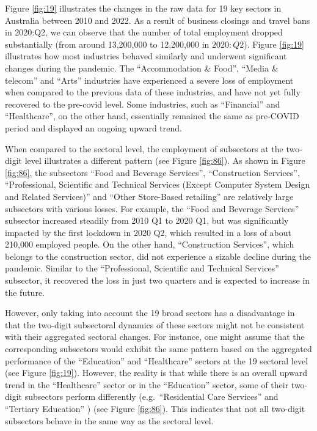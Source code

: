 \documentclass{monashthesis}
\begin{document}
Figure \ref{fig:19} illustrates the changes in the raw data for 19 key sectors in Australia between 2010 and 2022. As a result of business closings and travel bans in 2020:Q2, we can observe that the number of total employment dropped substantially (from around 13,200,000 to 12,200,000 in \(2020:Q2\)). Figure \ref{fig:19} illustrates how most industries behaved similarly and underwent significant changes during the pandemic. The ``Accommodation \& Food'', ``Media \& telecom'' and ``Arts'' industries have experienced a severe loss of employment when compared to the previous data of these industries, and have not yet fully recovered to the pre-covid level. Some industries, such as ``Financial'' and ``Healthcare'', on the other hand, essentially remained the same as pre-COVID period and displayed an ongoing upward trend.

When compared to the sectoral level, the employment of subsectors at the two-digit level illustrates a different pattern (see Figure \ref{fig:86}). As shown in Figure \ref{fig:86}, the subsectors ``Food and Beverage Services'', ``Construction Services'', ``Professional, Scientific and Technical Services (Except Computer System Design and Related Services)'' and ``Other Store-Based retailing'' are relatively large subsectors with various losses. For example, the ``Food and Beverage Services'' subsector increased steadily from 2010 Q1 to 2020 Q1, but was significantly impacted by the first lockdown in 2020 Q2, which resulted in a loss of about 210,000 employed people. On the other hand, ``Construction Services'', which belongs to the construction sector, did not experience a sizable decline during the pandemic. Similar to the ``Professional, Scientific and Technical Services'' subsector, it recovered the loss in just two quarters and is expected to increase in the future.

However, only taking into account the 19 broad sectors has a disadvantage in that the two-digit subsectoral dynamics of these sectors might not be consistent with their aggregated sectoral changes. For instance, one might assume that the corresponding subsectors would exhibit the same pattern based on the aggregated performance of the ``Education'' and ``Healthcare'' sectors at the 19 sectoral level (see Figure \ref{fig:19}). However, the reality is that while there is an overall upward trend in the ``Healthcare'' sector or in the ``Education'' sector, some of their two-digit subsectors perform differently (e.g.~``Residential Care Services'' and ``Tertiary Education'' ) (see Figure \ref{fig:86}). This indicates that not all two-digit subsectors behave in the same way as the sectoral level.
\end{document}
